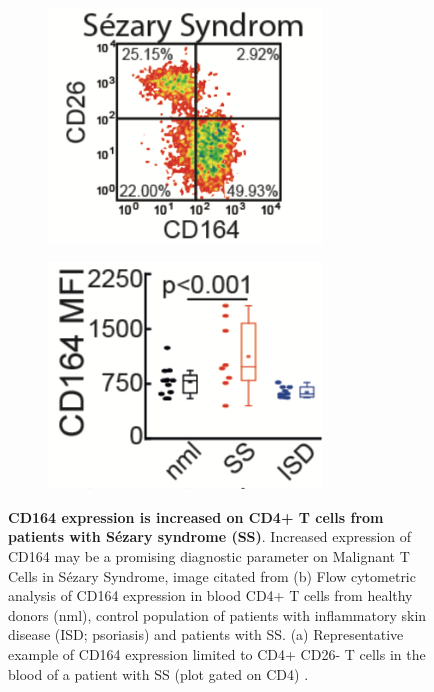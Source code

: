\begin{figure}[t]
	\begin{center}
		\begin{subfigure}[b]{0.49\textwidth}
		    \centering
			\includegraphics[width=0.8\textwidth]{thesis-template-master/images/cd164.png}
			\label{fig:cellnet}
            \caption{}
		\end{subfigure}
        \begin{subfigure}[b]{0.49\textwidth}
		    \centering
			\includegraphics[width=0.8\textwidth]{thesis-template-master/images/sezary and cd164.png}
			\label{fig:cellnet}
            \caption{}
		\end{subfigure}
	\end{center}
	\caption{\textbf{CD164 expression is increased on CD4+ T cells from patients with Sézary syndrome (SS)\cite{emma}}.  Increased expression of CD164 may be a promising diagnostic parameter on Malignant T Cells in Sézary Syndrome, image citated from \cite{emma}
(b) Flow cytometric analysis of CD164 expression in blood CD4+ T cells from healthy donors (nml), control population of patients with inflammatory skin disease (ISD; psoriasis) and patients with SS. (a) Representative example of CD164 expression limited to CD4+ CD26- T cells in the blood of a patient with SS (plot gated on CD4) \cite{emma}.}
    \label{fig:2.1} 
\end{figure}

